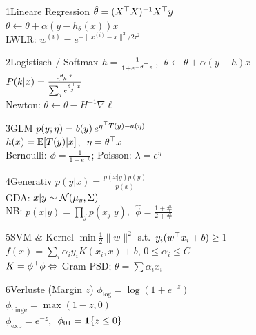 
\begin{hngrid}
%
\begin{hnp}[raster multicolumn=2,acc=hnorange]{1}{Lineare Regression}
$\hat\theta=(X^{\top} X)^{-1}X^{\top} y$\\[2pt]
$\theta\leftarrow\theta+\alpha(y-h_\theta(x))x$\\[2pt]
LWLR: $w^{(i)}=e^{-\|x^{(i)}-x\|^2/2\tau^2}$
\end{hnp}
%
\begin{hnp}[raster multicolumn=2,acc=hnpurple]{2}{Logistisch / Softmax}
$h=\frac{1}{1+e^{-\theta^{\top} x}}$, $\;\theta\leftarrow\theta+\alpha(y-h)x$\\[2pt]
$P(k|x)=\frac{e^{\theta_k^{\top} x}}{\sum_je^{\theta_j^{\top} x}}$\\[2pt]
Newton: $\theta\leftarrow\theta-H^{-1}\nabla\ell$
\end{hnp}
%
\begin{hnp}[raster multicolumn=2,acc=hnteal]{3}{GLM}
$p(y;\eta)=b(y)\,e^{\eta^{\top} T(y)-a(\eta)}$\\[2pt]
$h(x)=\mathbb{E}[T(y)|x]$, $\;\eta=\theta^{\top} x$\\[2pt]
Bernoulli: $\phi=\frac1{1+e^{-\eta}}$; Poisson: $\lambda=e^{\eta}$
\end{hnp}
%
\begin{hnp}[raster multicolumn=2,acc=hngreen]{4}{Generativ}
$p(y|x)=\frac{p(x|y)p(y)}{p(x)}$\\[2pt]
GDA: $x|y\sim\mathcal{N}(\mu_y,\Sigma)$\\[2pt]
NB: $p(x|y)=\prod_jp(x_j|y)$, $\;\hat\phi=\frac{1+\#}{2+\#}$
\end{hnp}
%
\begin{hnp}[raster multicolumn=2,acc=hnrose]{5}{SVM \& Kernel}
$\min\frac12\|w\|^2$ s.t.\ $y_i(w^{\top} x_i+b)\ge1$\\[2pt]
$f(x)=\sum_i\alpha_iy_iK(x_i,x)+b$, $0\le\alpha_i\le C$\\[2pt]
$K=\phi^{\top}\phi\Leftrightarrow$ Gram PSD; $\theta=\sum\alpha_ix_i$
\end{hnp}
%
\begin{hnp}[raster multicolumn=2,acc=hnnavy]{6}{Verluste (Margin $z$)}
$\phi_{\log}=\log(1+e^{-z})$\\[2pt]
$\phi_{\mathrm{hinge}}=\max(1-z,0)$\\[2pt]
$\phi_{\exp}=e^{-z}$, $\;\phi_{01}=\mathbf{1}\{z\le0\}$

\end{hnp}
\end{hngrid}
